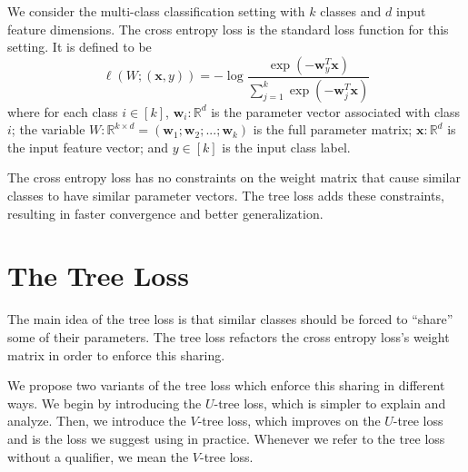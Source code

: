 \documentclass[twoside]{article}
\newcommand{\R}{\mathbb R}
\newcommand{\trans}[1]{{#1}^{T}}
\newcommand{\w}{\mathbf w}
\newcommand{\x}{\mathbf x}
\begin{document}
We consider the multi-class classification setting with $k$ classes and $d$ input feature dimensions.
The cross entropy loss is the standard loss function for this setting.
It is defined to be
\begin{equation}
    \label{eq:xentropy}
    \ell(W;(\x,y)) = - \log \frac {\exp(-\trans\w_y \x)}{\sum_{j=1}^k \exp(-\trans \w_j \x)}
\end{equation}
where for each class $i\in[k]$,
$\w_i : \R^d$ is the parameter vector associated with class $i$;
the variable $W : \R^{k \times d} = (\w_1; \w_2; ...; \w_k)$ is the full parameter matrix;
$\x : \R^d$ is the input feature vector;
and $y \in [k]$ is the input class label.

The cross entropy loss has no constraints on the weight matrix that cause similar classes to have similar parameter vectors.
The tree loss adds these constraints,
resulting in faster convergence and better generalization.


\section{The Tree Loss}
\label{sec:tree}

The main idea of the tree loss is that similar classes should be forced to ``share'' some of their parameters.
The tree loss refactors the cross entropy loss's weight matrix in order to enforce this sharing.

We propose two variants of the tree loss which enforce this sharing in different ways.
We begin by introducing the $U$-tree loss,
which is simpler to explain and analyze.
Then, we introduce the $V$-tree loss,
which improves on the $U$-tree loss and is the loss we suggest using in practice.
Whenever we refer to the tree loss without a qualifier,
we mean the $V$-tree loss.


\end{document}
